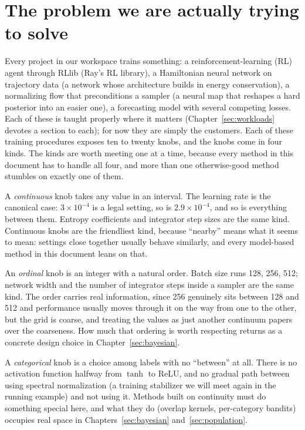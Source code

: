 \chapter{The problem we are actually trying to solve}
\label{sec:problem}

Every project in our workspace trains something: a reinforcement-learning
(RL) agent through RLlib (Ray's RL library), a Hamiltonian
neural network on trajectory data (a network whose architecture builds in
energy conservation), a normalizing flow that preconditions a sampler (a
neural map that reshapes a hard posterior into an easier one), a
forecasting model with several competing losses. Each of these is taught
properly where it matters (Chapter~\ref{sec:workloads} devotes a section
to each); for now they are simply the customers. Each of these training procedures exposes ten to twenty
knobs, and the knobs come in four kinds. The kinds are worth meeting one
at a time, because every method in this document has to handle all four,
and more than one otherwise-good method stumbles on exactly one of them.

A \emph{continuous} knob takes any value in an interval. The learning
rate is the canonical case: $3 \times 10^{-4}$ is a legal setting, so is
$2.9 \times 10^{-4}$, and so is everything between them. Entropy
coefficients and integrator step sizes are the same kind. Continuous
knobs are the friendliest kind, because ``nearby'' means what it seems
to mean: settings close together usually behave similarly, and every
model-based method in this document leans on that.

An \emph{ordinal} knob is an integer with a natural order. Batch size
runs 128, 256, 512; network width and the number of integrator steps
inside a sampler are the same kind. The order carries real information, since 256 genuinely
sits between 128 and 512 and performance usually moves through it on
the way from one to the other, but the grid is coarse, and treating
the values as just another continuum papers over the coarseness. How
much that ordering is worth respecting returns as a concrete design
choice in Chapter~\ref{sec:bayesian}.

A \emph{categorical} knob is a choice among labels with no ``between''
at all. There is no activation function halfway from $\tanh$ to ReLU,
and no gradual path between using spectral normalization (a training
stabilizer we will meet again in the running example) and not using
it. Methods built on continuity must do something special here, and
what they do (overlap kernels, per-category bandits) occupies real
space in Chapters~\ref{sec:bayesian} and~\ref{sec:population}.


